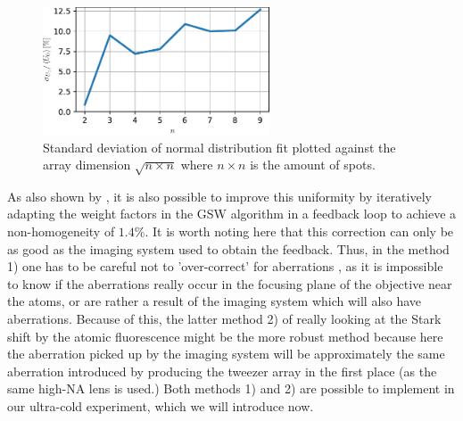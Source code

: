 \begin{figure}
    \centering
    \includegraphics[width=0.6\textwidth]{figures/UniformityAmountsSpots.pdf}
    \caption{Standard deviation of normal distribution fit plotted against the array dimension $\sqrt{n\times n}$ where $n \times n$ is the amount of spots. }
    \label{fig:Uniformity}
\end{figure}
As also shown by \cite{Nogrette2014}, it is also possible to improve this uniformity by iteratively adapting the weight factors in the \ac{GSW} algorithm in a feedback loop to achieve a non-homogeneity of $1.4\%$.
It is worth noting here that this correction can only be as good as the imaging system used to obtain the feedback. 
Thus, in the method 1) one has to be careful not to 'over-correct' for aberrations \cite{Labuhn2016}, as it is impossible to know if the aberrations really occur in the focusing plane of the objective near the atoms, or are rather a result of the imaging system which will also have aberrations. 
Because of this, the latter method 2) of really looking at the Stark shift by the atomic fluorescence might be the more robust method because here the aberration picked up by the imaging system will be approximately the same aberration introduced by producing the tweezer array in the first place (as the same high-NA lens is used.)
Both methods 1) and 2) are possible to implement in our ultra-cold experiment, which we will introduce now.







